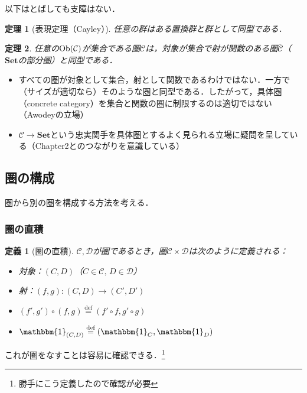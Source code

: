 \documentclass[dvipdfmx,a4j,10pt]{jsarticle}
\theoremstyle{mystyle1}
\theoremstyle{mystyle2}
\newtheorem{dfn*}{定義}
\newtheorem{thm*}{定理}
\newcommand*{\defeq}{\stackrel{\text{def}}{=}}
\newcommand{\Ob}{{\rm Ob}}
\begin{document}
    以下はとばしても支障はない．
    \begin{thm*}[表現定理（Cayley）]
        任意の群はある置換群と群として同型である．
    \end{thm*}

    \begin{thm*}
        任意の$\Ob(\mathcal{C})$が集合である圏$\mathcal{C}$は，対象が集合で射が関数のある圏$\overline{\mathcal{C}}$（$\mathbf{Set}$の部分圏）と同型である．
    \end{thm*}

    \begin{itemize}
        \item すべての圏が対象として集合，射として関数であるわけではない．一方で（サイズが適切なら）そのような圏と同型である．したがって，具体圏（concrete category）を集合と関数の圏に制限するのは適切ではない（Awodeyの立場）
        \item $\mathcal{C}\to\mathbf{Set}$という忠実関手を具体圏とするよく見られる立場に疑問を呈している（Chapter2とのつながりを意識している）
    \end{itemize}

    \subsection{圏の構成}

    圏から別の圏を構成する方法を考える．

    \subsubsection{圏の直積}

    \begin{dfn*}[圏の直積]
        $\mathcal{C},\mathcal{D}$が圏であるとき，圏$\mathcal{C}\times\mathcal{D}$は次のように定義される：
        \begin{itemize}
            \item 対象：$(C,D)$（$C\in\mathcal{C},\, D\in\mathcal{D}$）
            \item 射：$(f,g):(C,D)\to(C',D')$
            \item $(f',g')\circ(f,g)\defeq(f'\circ f,g'\circ g)$
            \item $\mathbbm{1}_{(C,D)}\defeq(\mathbbm{1}_C,\mathbbm{1}_D)$
        \end{itemize}
    \end{dfn*}

    これが圏をなすことは容易に確認できる．\footnote{勝手にこう定義したので確認が必要}
\end{document}
